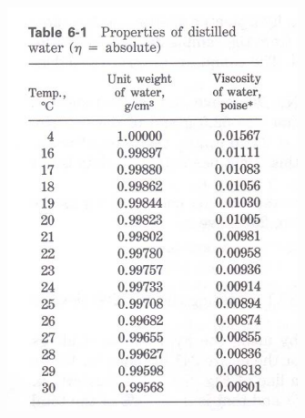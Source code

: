 \documentclass{article}
\begin{document}
\begin{center}
\newpage
\includegraphics*[scale=1]{Properties_of_distilled_water.PNG}
\end{center}
\end{document}
